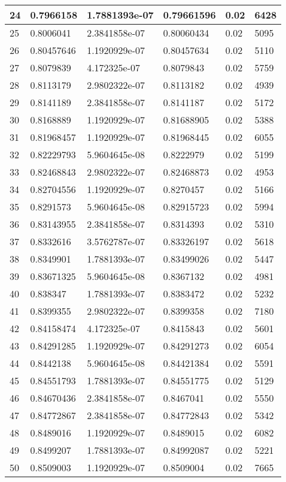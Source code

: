 \begin{longtable}{|l|l|l|l|l|l|}
24 & 0.7966158 & 1.7881393e-07 & 0.79661596 & 0.02 & 6428 \\ \hline 
25 & 0.8006041 & 2.3841858e-07 & 0.80060434 & 0.02 & 5095 \\ \hline 
26 & 0.80457646 & 1.1920929e-07 & 0.80457634 & 0.02 & 5110 \\ \hline 
27 & 0.8079839 & 4.172325e-07 & 0.8079843 & 0.02 & 5759 \\ \hline 
28 & 0.8113179 & 2.9802322e-07 & 0.8113182 & 0.02 & 4939 \\ \hline 
29 & 0.8141189 & 2.3841858e-07 & 0.8141187 & 0.02 & 5172 \\ \hline 
30 & 0.8168889 & 1.1920929e-07 & 0.81688905 & 0.02 & 5388 \\ \hline 
31 & 0.81968457 & 1.1920929e-07 & 0.81968445 & 0.02 & 6055 \\ \hline 
32 & 0.82229793 & 5.9604645e-08 & 0.8222979 & 0.02 & 5199 \\ \hline 
33 & 0.82468843 & 2.9802322e-07 & 0.82468873 & 0.02 & 4953 \\ \hline 
34 & 0.82704556 & 1.1920929e-07 & 0.8270457 & 0.02 & 5166 \\ \hline 
35 & 0.8291573 & 5.9604645e-08 & 0.82915723 & 0.02 & 5994 \\ \hline 
36 & 0.83143955 & 2.3841858e-07 & 0.8314393 & 0.02 & 5310 \\ \hline 
37 & 0.8332616 & 3.5762787e-07 & 0.83326197 & 0.02 & 5618 \\ \hline 
38 & 0.8349901 & 1.7881393e-07 & 0.83499026 & 0.02 & 5447 \\ \hline 
39 & 0.83671325 & 5.9604645e-08 & 0.8367132 & 0.02 & 4981 \\ \hline 
40 & 0.838347 & 1.7881393e-07 & 0.8383472 & 0.02 & 5232 \\ \hline 
41 & 0.8399355 & 2.9802322e-07 & 0.8399358 & 0.02 & 7180 \\ \hline 
42 & 0.84158474 & 4.172325e-07 & 0.8415843 & 0.02 & 5601 \\ \hline 
43 & 0.84291285 & 1.1920929e-07 & 0.84291273 & 0.02 & 6054 \\ \hline 
44 & 0.8442138 & 5.9604645e-08 & 0.84421384 & 0.02 & 5591 \\ \hline 
45 & 0.84551793 & 1.7881393e-07 & 0.84551775 & 0.02 & 5129 \\ \hline 
46 & 0.84670436 & 2.3841858e-07 & 0.8467041 & 0.02 & 5550 \\ \hline 
47 & 0.84772867 & 2.3841858e-07 & 0.84772843 & 0.02 & 5342 \\ \hline 
48 & 0.8489016 & 1.1920929e-07 & 0.8489015 & 0.02 & 6082 \\ \hline 
49 & 0.8499207 & 1.7881393e-07 & 0.84992087 & 0.02 & 5221 \\ \hline 
50 & 0.8509003 & 1.1920929e-07 & 0.8509004 & 0.02 & 7665 \\ \hline 
\end{longtable}